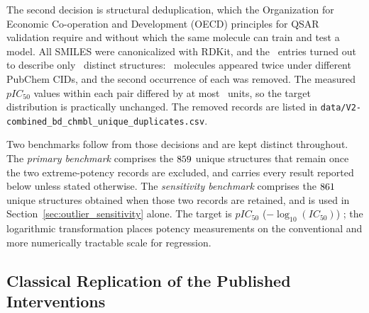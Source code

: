 The second decision is structural deduplication, which the Organization for Economic Co-operation and Development
(OECD) principles for QSAR validation require \citep{tropsha2010, cherkasov2014, iwuala2025} and without which the
same molecule can train and test a model. All SMILES were canonicalized with RDKit, and the \DataNAfterOutliers\
entries turned out to describe only \DataNMain\ distinct structures: \DataNDuplicatesRemoved\ molecules appeared twice
under different PubChem CIDs, and the second occurrence of each was removed. The measured $pIC_{50}$ values within
each pair differed by at most \DataDuplicateMaxSpread\ units, so the target distribution is practically unchanged. The
removed records are listed in \texttt{data/V2-combined\_bd\_chmbl\_unique\_duplicates.csv}.

Two benchmarks follow from those decisions and are kept distinct throughout. The \emph{primary benchmark} comprises
the $859$ unique structures that remain once the two extreme-potency records are excluded, and carries every
result reported below unless stated otherwise. The \emph{sensitivity benchmark} comprises the $861$ unique
structures obtained when those two records are retained, and is used in Section~\ref{sec:outlier_sensitivity} alone.
The target is $pIC_{50}$ ($-\log_{10}(IC_{50})$) \citep{karimova2025}; the logarithmic transformation places potency
measurements on the conventional and more numerically tractable scale for regression.


\subsection{Classical Replication of the Published Interventions}
\label{sec:materials_replication}

